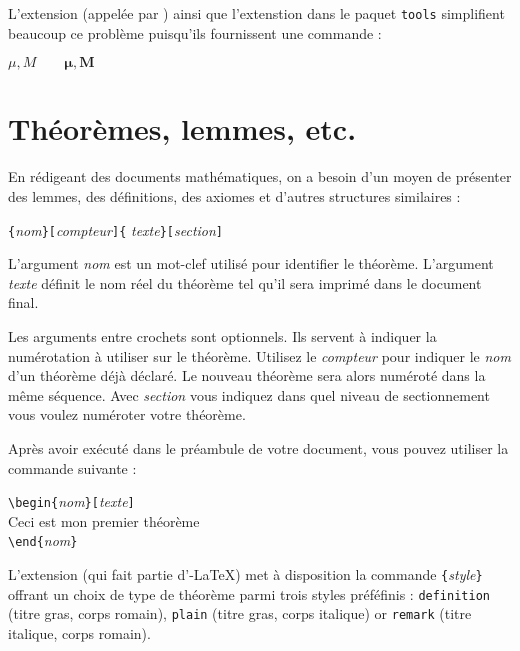 L'extension  (appelée par ) ainsi que
l'extenstion  dans le paquet \texttt{tools} simplifient
beaucoup ce problème puisqu'ils fournissent une commande
 :

\begin{example}
$\mu, M \qquad
\boldsymbol{\mu}, \boldsymbol{M}$
\end{example}


\section{Théorèmes, lemmes, etc.}

En rédigeant des documents mathématiques, on a besoin d'un moyen de
présenter des lemmes, des définitions, des axiomes et d'autres
structures similaires :
\begin{lscommand}
\verb|{|\emph{nom}\verb|}[|\emph{compteur}\verb|]{|%
         \emph{texte}\verb|}[|\emph{section}\verb|]|
\end{lscommand}
L'argument \emph{nom} est un mot-clef utilisé pour identifier le
théorème. L'argument \emph{texte} définit le nom réel du théorème tel
qu'il sera imprimé dans le document final.

Les arguments entre crochets sont optionnels. Ils servent à
indiquer la numérotation à utiliser sur le théorème. Utilisez
le \emph{compteur} pour indiquer le \emph{nom} d'un théorème déjà
déclaré. Le nouveau théorème sera alors numéroté dans la même
séquence. Avec \emph{section} vous indiquez dans quel niveau de
sectionnement vous voulez numéroter votre théorème.

Après avoir exécuté  dans le préambule de votre
document, vous pouvez utiliser la commande suivante :

\begin{code}
\verb|\begin{|\emph{nom}\verb|}[|\emph{texte}\verb|]|\\
Ceci est mon premier théorème\\
\verb|\end{|\emph{nom}\verb|}|
\end{code}

L'extension  (qui fait partie d'\AmS-LaTeX) met à
disposition la commande
\verb|{|\emph{style}\verb|}| offrant un choix de type de
théorème parmi trois styles
préféfinis : \texttt{definition} (titre gras, corps romain),
\texttt{plain} (titre gras, corps italique) or \texttt{remark} (titre
italique, corps romain).

